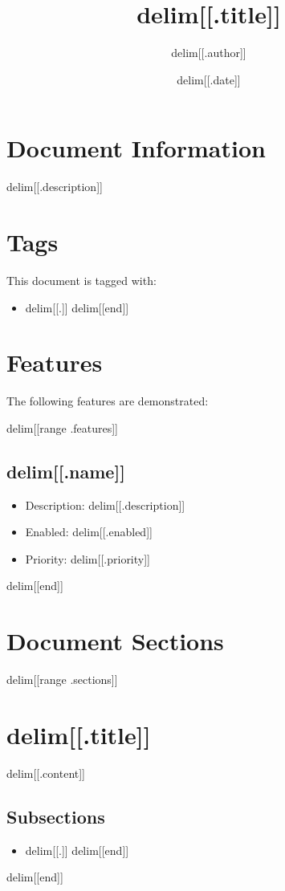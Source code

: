 \documentclass{article}
\title{delim[[.title]]}
\author{delim[[.author]]}
\date{delim[[.date]]}
\begin{document}
\maketitle

\section{Document Information}
delim[[.description]]

\section{Tags}
This document is tagged with:
\begin{itemize}
delim[[range .tags]]
\item delim[[.]]
delim[[end]]
\end{itemize}

\section{Features}
The following features are demonstrated:

delim[[range .features]]
\subsection{delim[[.name]]}
\begin{itemize}
\item Description: delim[[.description]]
\item Enabled: delim[[.enabled]]
\item Priority: delim[[.priority]]
\end{itemize}
delim[[end]]

\section{Document Sections}
delim[[range .sections]]
\section{delim[[.title]]}
delim[[.content]]

\subsection{Subsections}
\begin{itemize}
delim[[range .subsections]]
\item delim[[.]]
delim[[end]]
\end{itemize}
delim[[end]]
\end{document}
